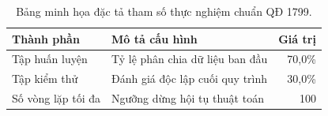 \begin{table}[ht!]
  \centering
  \caption{Bảng minh họa đặc tả tham số thực nghiệm chuẩn QĐ 1799.}\label{tab:sample_data}
  \begin{tabular}{llr}
    \toprule
    \textbf{Thành phần} & \textbf{Mô tả cấu hình} & \textbf{Giá trị} \\ \midrule
    Tập huấn luyện      & Tỷ lệ phân chia dữ liệu ban đầu & 70,0\% \\
    Tập kiểm thử        & Đánh giá độc lập cuối quy trình & 30,0\% \\
    Số vòng lặp tối đa  & Ngưỡng dừng hội tụ thuật toán & 100 \\
    \bottomrule
  \end{tabular}
\end{table}
